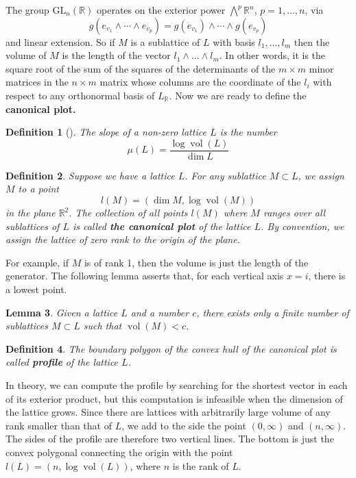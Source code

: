 \documentclass[12pt]{article} %
\newtheorem{definition}{Definition}[section]
\newtheorem{lemma}[definition]{Lemma}
\DeclareMathOperator{\vol}{vol}
\begin{document}
The group $\mathrm{GL}_n(\mathbb{R})$ operates on the exterior power $\bigwedge^p \mathbb{R}^n$, $p = 1, \ldots, n$, via \[g(e_{v_1} \wedge \cdots \wedge e_{v_p}) = g(e_{v_1}) \wedge \cdots \wedge g(e_{v_p})\] and linear extension.
So if $M$ is a sublattice of $L$ with basis $l_1,\ldots,l_m$ then the volume
of $M$ is the length of the vector $l_1 \wedge \ldots \wedge l_m$. In other words, it is the square root
of the sum of the squares of the determinants of the $m \times m$ minor matrices in the $n \times m$ matrix whose columns are the coordinate of the $l_i$ with respect to any orthonormal basis of $L_\mathbb{R}$.
Now we are ready to define the \textbf{canonical plot.}
\begin{definition}[\label = slope]
    The slope of a non-zero lattice $L$ is the number
    \[\mu(L) = \dfrac{\log\vol(L)}{\dim L}\]
\end{definition}
\begin{definition}
    Suppose we have a lattice $L$. For any sublattice $M \subset L$, we assign $M$ to a point
    \[l(M) = \left(\dim M, \log\vol(M)\right)\]
    in the plane $\mathbb{R}^2$. The collection of all points $l(M)$ where $M$ ranges over
    all sublattices of $L$ is called \textbf{ the canonical plot} of the lattice $L$. By convention, we assign
    the lattice of zero rank to the origin of the plane.
\end{definition}
For example, if $M$ is of rank 1, then the volume is just the length of the generator.
The following lemma asserts that, for each vertical axis $x =i$, there is a lowest point.
\begin{lemma}
    Given a lattice $L$ and a number $c$, there exists only a finite number of sublattices $M \subset L$ such that
    $\vol(M)<c$.
\end{lemma}
\begin{definition}
    The boundary polygon of the convex hull of the canonical plot is called \textbf{profile} of the lattice $L$.
\end{definition}
In theory, we can compute the profile by searching for the shortest vector in each of its exterior product, but this computation
is infeasible when the dimension of the lattice grows. Since there are lattices with
arbitrarily large volume of any rank smaller than that of $L$, we add to the side the point $(0,\infty)$ and $(n,\infty)$. The sides
of the profile are therefore two vertical lines. The bottom is just the convex polygonal connecting the origin with the point
$l(L) = (n,\log\vol(L))$, where $n$ is the rank of $L$.
\end{document}

